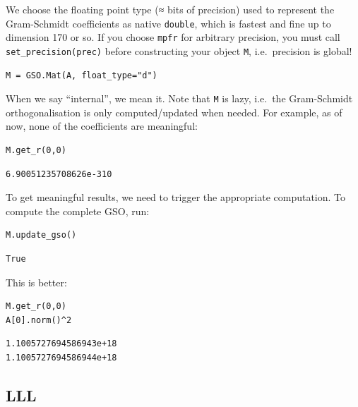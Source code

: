 \documentclass[10pt,a4paper,nobib]{tufte-handout}
\begin{document}
We choose the floating point type (≈ bits of precision) used to represent the Gram-Schmidt coefficients as native \texttt{double}, which is fastest and fine up to dimension 170 or so. If you choose \texttt{mpfr} for arbitrary precision, you must call \texttt{set\_precision(prec)} before constructing your object \texttt{M}, i.e. precision is global!

\lstset{language=sage,label= ,caption= ,captionpos=b,numbers=none}
\begin{lstlisting}
M = GSO.Mat(A, float_type="d")
\end{lstlisting}

When we say “internal”, we mean it. Note that \texttt{M} is lazy, i.e. the Gram-Schmidt orthogonalisation is only computed/updated when needed. For example, as of now, none of the coefficients are meaningful:

\lstset{language=sage,label= ,caption= ,captionpos=b,numbers=none}
\begin{lstlisting}
M.get_r(0,0)
\end{lstlisting}

\begin{verbatim}
6.90051235708626e-310
\end{verbatim}

To get meaningful results, we need to trigger the appropriate computation. To compute the complete GSO, run:

\lstset{language=sage,label= ,caption= ,captionpos=b,numbers=none}
\begin{lstlisting}
M.update_gso()
\end{lstlisting}

\begin{verbatim}
True
\end{verbatim}

This is better:

\lstset{language=sage,label= ,caption= ,captionpos=b,numbers=none}
\begin{lstlisting}
M.get_r(0,0)
A[0].norm()^2
\end{lstlisting}

\begin{verbatim}
1.1005727694586943e+18
1.1005727694586944e+18
\end{verbatim}

\subsection{LLL}
\label{sec:org79ed09a}
\end{document}
